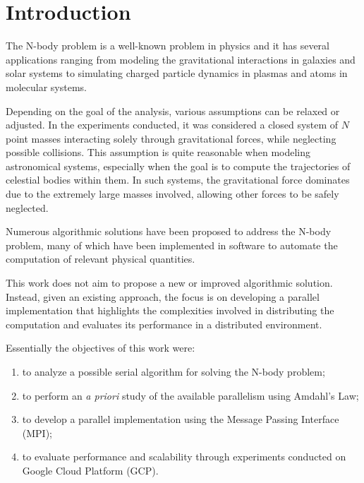 \documentclass{article}
\begin{document}
\tableofcontents

\clearpage
\thispagestyle{plain}

\twocolumn

\section{Introduction}
\label{sec:intro}
The N-body problem is a well-known problem in physics and it has several applications ranging from modeling the gravitational interactions in galaxies and solar systems to simulating charged particle dynamics in plasmas and atoms in molecular systems.

Depending on the goal of the analysis, various assumptions can be relaxed or adjusted. In the experiments conducted, it was considered a closed system of $N$ point masses interacting solely through gravitational forces, while neglecting possible collisions. This assumption is quite reasonable when modeling astronomical systems, especially when the goal is to compute the trajectories of celestial bodies within them. In such systems, the gravitational force dominates due to the extremely large masses involved, allowing other forces to be safely neglected.

Numerous algorithmic solutions have been proposed to address the N-body problem, many of which have been implemented in software to automate the computation of relevant physical quantities.

This work does not aim to propose a new or improved algorithmic solution. Instead, given an existing approach, the focus is on developing a parallel implementation that highlights the complexities involved in distributing the computation and evaluates its performance in a distributed environment.

Essentially the objectives of this work were:
\begin{enumerate}
\item to analyze a possible serial algorithm for solving the N-body problem;
\item to perform an \emph{a priori} study of the available parallelism using Amdahl's Law;
\item to develop a parallel implementation using the Message Passing Interface (MPI);
\item to evaluate performance and scalability through experiments conducted on Google Cloud Platform (GCP).
\end{enumerate}
\end{document}
